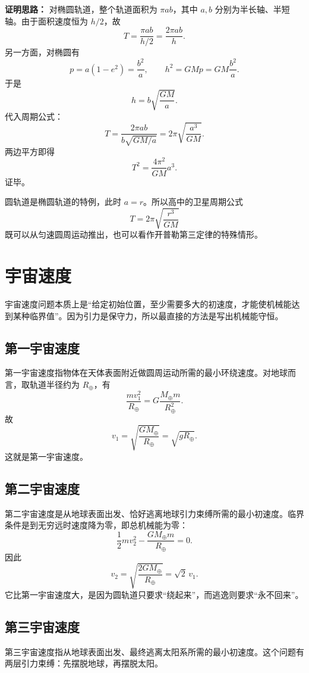 \textbf{证明思路：} 对椭圆轨道，整个轨道面积为 $\pi ab$，其中 $a,b$ 分别为半长轴、半短轴。由于面积速度恒为 $h/2$，故
\[
T=\frac{\pi ab}{h/2}=\frac{2\pi ab}{h}.
\]
另一方面，对椭圆有
\[
p=a(1-e^2)=\frac{b^2}{a},\qquad h^2=GMp=GM\frac{b^2}{a}.
\]
于是
\[
h=b\sqrt{\frac{GM}{a}}.
\]
代入周期公式：
\[
T=\frac{2\pi ab}{b\sqrt{GM/a}}=2\pi\sqrt{\frac{a^3}{GM}}.
\]
两边平方即得
\[
T^2=\frac{4\pi^2}{GM}a^3.
\]
证毕。

\begin{remark}
圆轨道是椭圆轨道的特例，此时 $a=r$。所以高中的卫星周期公式
\[
T=2\pi\sqrt{\frac{r^3}{GM}}
\]
既可以从匀速圆周运动推出，也可以看作开普勒第三定律的特殊情形。
\end{remark}

\section{宇宙速度}

宇宙速度问题本质上是“给定初始位置，至少需要多大的初速度，才能使机械能达到某种临界值”。因为引力是保守力，所以最直接的方法是写出机械能守恒。

\subsection{第一宇宙速度}

第一宇宙速度指物体在天体表面附近做圆周运动所需的最小环绕速度。对地球而言，取轨道半径约为 $R_\oplus$，有
\[
\frac{mv_1^2}{R_\oplus}=G\frac{M_\oplus m}{R_\oplus^2}.
\]
故
\[
v_1=\sqrt{\frac{GM_\oplus}{R_\oplus}}=\sqrt{gR_\oplus}.
\]
这就是第一宇宙速度。

\subsection{第二宇宙速度}

第二宇宙速度是从地球表面出发、恰好逃离地球引力束缚所需的最小初速度。临界条件是到无穷远时速度降为零，即总机械能为零：
\[
\frac12 mv_2^2-\frac{GM_\oplus m}{R_\oplus}=0.
\]
因此
\[
v_2=\sqrt{\frac{2GM_\oplus}{R_\oplus}}=\sqrt{2}\,v_1.
\]
它比第一宇宙速度大，是因为圆轨道只要求“绕起来”，而逃逸则要求“永不回来”。

\subsection{第三宇宙速度}

第三宇宙速度指从地球表面出发、最终逃离太阳系所需的最小初速度。这个问题有两层引力束缚：先摆脱地球，再摆脱太阳。

